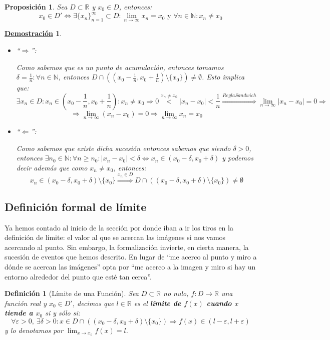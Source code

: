 \documentclass[10pt,a4paper,openright]{book}
\theoremstyle{break}
\newtheorem{defi}{Definición}[chapter]
\newtheorem{prop}{Proposición}[chapter]
\newtheorem*{demo}{\underline{Demostración}}
\begin{document}
\begin{prop}
Sea $D\subset \mathbb R$ y $x_0\in D$, entonces:
$$x_0 \in D' \Leftrightarrow \exists \{x_n\}_{n=1}^\infty \subset D: \lim_{n\rightarrow \infty} x_n=x_0\mbox{ y } \forall n \in \mathbb{N} : x_n \neq x_0$$
\end{prop}
\begin{demo}
\begin{itemize}
\item ``$\Rightarrow $'':\par
Como sabemos que es un punto de acumulación, entonces tomamos $\delta=\frac{1}{n}: \forall n\in \mathbb N$, entonces $D\cap \left((x_0-\frac{1}{n}, x_0+\frac{1}{n})\mbox{\textbackslash} \{x_0\}\right)\neq \emptyset$. Esto implica que:
$$\exists x_n\in D: x_n\in \left(x_0-\frac{1}{n}, x_0+\frac{1}{n}\right): x_n\neq x_0\Rightarrow 0\stackrel{x_n\neq x_0}{<}|x_n-x_0|<\frac{1}{n} \stackrel{ReglaSandwich}{\Rightarrow} \lim_{n\rightarrow \infty} |x_n-x_0|=0\Rightarrow$$
$$\Rightarrow \lim_{n\rightarrow \infty} (x_n-x_0)=0\Rightarrow \lim_{n\rightarrow \infty} x_n=x_0$$

\item ``$\Leftarrow$'':\par
Como sabemos que existe dicha sucesión entonces sabemos que siendo $\delta >0$, entonces $\exists n_0\in \mathbb N: \forall n\geq n_0: |x_n-x_0|<\delta\Leftrightarrow x_n\in (x_0-\delta , x_0+\delta)$ y podemos decir además que como $x_n\neq x_0$, entonces:
$$x_n\in (x_0-\delta , x_0+\delta)\mbox{\textbackslash} \{x_0\}\stackrel{x_n\in D}{\Rightarrow} D\cap\left((x_0-\delta , x_0+\delta)\mbox{\textbackslash} \{x_0\}\right) \neq \emptyset$$
\end{itemize}
\end{demo}

\subsection{Definición formal de límite}
Ya hemos contado al inicio de la sección por donde iban a ir los tiros en la definición de límite: el valor al que se acercan las imágenes si nos vamos acercando al punto. Sin embargo, la formalización invierte, en cierta manera, la sucesión de eventos que hemos descrito. En lugar de ``me acerco al punto y miro a dónde se acercan las imágenes'' opta por ``me acerco a la imagen y miro si hay un entorno alrededor del punto que esté tan cerca''.

\begin{defi}[Límite de una Función]
Sea $D\subset \mathbb R$ no nulo, $f:D\longrightarrow \mathbb R$ una función real y $x_0\in D'$, decimos que $l\in \mathbb R$ es el \textbf{límite de $f(x)$ cuando $x$ tiende a $x_0$} si y sólo si:
\[
\forall \varepsilon>0, \ \exists \delta>0 : x\in D\cap \left((x_0-\delta, x_0+\delta)\mbox{\textbackslash} \{x_0\}\right)\Rightarrow f(x)\in (l-\varepsilon, l+\varepsilon)
\]
y lo denotamos por $\lim_{x\rightarrow x_0} f(x) = l$.
\end{defi}
\end{document}
